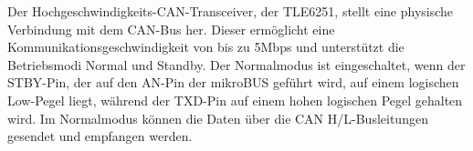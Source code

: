 Der Hochgeschwindigkeits-CAN-Transceiver, der TLE6251, stellt eine physische Verbindung mit dem CAN-Bus her. Dieser ermöglicht eine Kommunikationsgeschwindigkeit von bis zu 5Mbps und unterstützt die Betriebsmodi Normal und Standby. Der Normalmodus ist eingeschaltet, wenn der STBY-Pin, der auf den AN-Pin der mikroBUS geführt wird, auf einem logischen Low-Pegel liegt, während der TXD-Pin auf einem hohen logischen Pegel gehalten wird. Im Normalmodus können die Daten über die CAN H/L-Busleitungen gesendet und empfangen werden.


